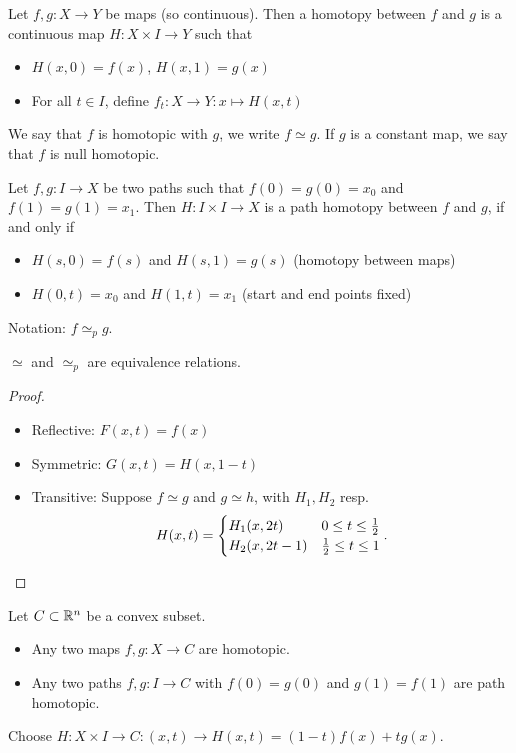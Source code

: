 \begin{definition}[Homotopy]
    Let $f,g:X\to Y$ be maps (so continuous). Then a homotopy between $f$ and $g$ is a continuous map $H: X\times I \to Y$ such that
    \begin{itemize}
        \item $H(x, 0) = f(x)$, $H(x, 1) = g(x)$ 
        \item For all $t \in I$, define $f_t: X \to  Y: x \mapsto  H(x, t)$
    \end{itemize}
    We say that $f$ is homotopic with $g$, we write $f \simeq g$.
    If $g$ is a constant map, we say that $f$ is null homotopic.
\end{definition}

\begin{definition}
    Let $f, g: I \to  X$ be two paths such that $f(0) = g(0) = x_0$ and $f(1) = g(1) = x_1$. Then $H: I \times  I \to  X$ is a path homotopy between $f$ and $g$, if and only if
    \begin{itemize}
        \item $H(s,0) = f(s)$ and  $H(s, 1) = g(s)$ (homotopy between maps)
        \item  $H(0, t) = x_0$ and $H(1, t) = x_1$ (start and end points fixed)
    \end{itemize}
    Notation: $f \simeq_p g$.
\end{definition}

\begin{lemma}
    $\simeq$ and  $\simeq_p$ are equivalence relations.
\end{lemma}
\begin{proof}
    \leavevmode
    \begin{itemize}
        \item Reflective: $F(x, t) = f(x)$
        \item Symmetric: $G(x, t) = H(x, 1-t)$ 
        \item Transitive:  Suppose $f \simeq g$ and  $g \simeq h$, with  $H_1, H_2$ resp.
            \[
                H(x, t) = \begin{cases}
                    H_1(x, 2t) & 0 \le t \le  \frac{1}{2}\\
                    H_2(x, 2t-1) & \frac{1}{2} \le  t \le  1
                \end{cases}
            . \qedhere
        \] 
    \end{itemize}
\end{proof}


\begin{eg}
   Let $C \subset \mathbb{R}^n$ be a convex subset.
   \begin{itemize}
       \item Any two maps $f, g: X \to C$ are homotopic.
       \item Any two paths $f, g: I \to  C$ with $f(0) = g(0)$ and  $g(1) = f(1)$ are path homotopic.
   \end{itemize}

   Choose $H: X \times I \to  C: (x, t) \to  H(x, t) = (1-t) f(x) + t g(x)$.
\end{eg}


